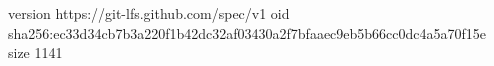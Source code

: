 version https://git-lfs.github.com/spec/v1
oid sha256:ec33d34cb7b3a220f1b42dc32af03430a2f7bfaaec9eb5b66cc0dc4a5a70f15e
size 1141
